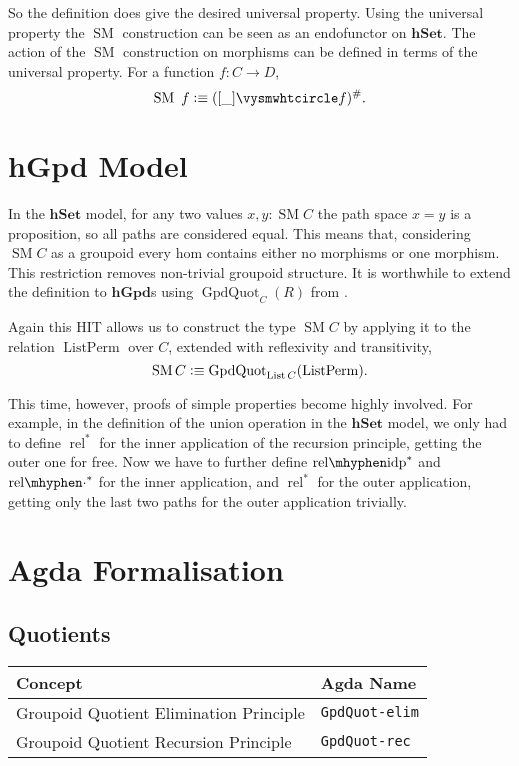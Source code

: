 \documentclass[12pt, parskip, DIV=14]{scrbook}
\newcommand{\defeq}{\vcentcolon\equiv}
\renewcommand{\circ}{\vysmwhtcircle}
\newcommand{\SM}{\operatorname{SM}}
\newcommand{\hSet}{\mathbf{hSet}}
\newcommand{\hGpd}{\mathbf{hGpd}}
\newcommand{\List}{\operatorname{List}}
\newcommand{\rels}{\operatorname{rel}^*}
\newcommand{\relidps}{\operatorname{rel\mhyphen idp}^*}
\newcommand{\reldots}{\operatorname{rel\mhyphen \cdot}^*}
\newcommand{\GpdQuot}{\operatorname{GpdQuot}_C(R)}
\newcommand{\ListPerm}{\operatorname{ListPerm}}
\begin{document}
So the definition does give the desired universal property. Using the universal property the $\SM$ construction can be seen as an endofunctor on $\hSet$. The action of the $\SM$ construction on morphisms can be defined in terms of the universal property. For a function $f : C \to D$, $$\SM~f \defeq ([\_] \circ f)^\#.$$

\section{hGpd Model}
\label{sec:hgpdmodel}

In the $\hSet$ model, for any two values $x, y : \SM C$ the path space $x = y$ is a proposition, so all paths are considered equal. This means that, considering $\SM C$ as a groupoid every hom contains either no morphisms or one morphism. This restriction removes non-trivial groupoid structure. It is worthwhile to extend the definition to $\hGpd$s using $\GpdQuot$ from .

Again this HIT allows us to construct the type $\SM C$ by applying it to the relation $\ListPerm$ over $C$, extended with reflexivity and transitivity,
$$\SM C \defeq \operatorname{GpdQuot}_{\List C}(\ListPerm).$$

This time, however, proofs of simple properties become highly involved. For example, in the definition of the union operation in the $\hSet$ model, we only had to define $\rels$ for the inner application of the recursion principle, getting the outer one for free. Now we have to further define $\relidps$ and $\reldots$ for the inner application, and $\rels$ for the outer application, getting only the last two paths for the outer application trivially.


\section{Agda Formalisation}

\subsection{Quotients}

\begin{center}
\begin{tabular}{ll}
  Concept & Agda Name \\
  \hline
  Groupoid Quotient Elimination Principle & \texttt{GpdQuot-elim} \\
  Groupoid Quotient Recursion Principle & \texttt{GpdQuot-rec} \\
\end{tabular}
\end{center}
\end{document}
